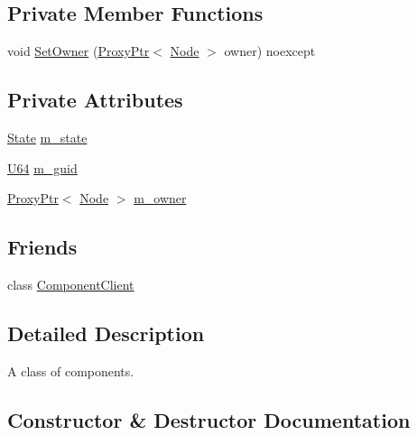 \subsection*{Private Member Functions}
\begin{DoxyCompactItemize}
\item 
void \mbox{\hyperlink{classmage_1_1_component_aed5c7f7af79357f708c71572d7d99638}{Set\+Owner}} (\mbox{\hyperlink{classmage_1_1_proxy_ptr}{Proxy\+Ptr}}$<$ \mbox{\hyperlink{classmage_1_1_node}{Node}} $>$ owner) noexcept
\end{DoxyCompactItemize}
\subsection*{Private Attributes}
\begin{DoxyCompactItemize}
\item 
\mbox{\hyperlink{namespacemage_ae47d13d8477ee94893b9a3947d28eebc}{State}} \mbox{\hyperlink{classmage_1_1_component_a541a035d18f4d9f3873996716a8192d5}{m\+\_\+state}}
\item 
\mbox{\hyperlink{namespacemage_a6672cf3c861707ce4a3235a3eb43941d}{U64}} \mbox{\hyperlink{classmage_1_1_component_a3ddfe848bbd16a86dbdfd2717c0618da}{m\+\_\+guid}}
\item 
\mbox{\hyperlink{classmage_1_1_proxy_ptr}{Proxy\+Ptr}}$<$ \mbox{\hyperlink{classmage_1_1_node}{Node}} $>$ \mbox{\hyperlink{classmage_1_1_component_ad32770e1f30112cebd2894c1e976a4a7}{m\+\_\+owner}}
\end{DoxyCompactItemize}
\subsection*{Friends}
\begin{DoxyCompactItemize}
\item 
class \mbox{\hyperlink{classmage_1_1_component_a12f171c7a6bd27671b33ad16b0e42a6a}{Component\+Client}}
\end{DoxyCompactItemize}


\subsection{Detailed Description}
A class of components. 

\subsection{Constructor \& Destructor Documentation}
\mbox{\label{classmage_1_1_component_a2326c6df733b0cabf3086ad4187ba607}} 

